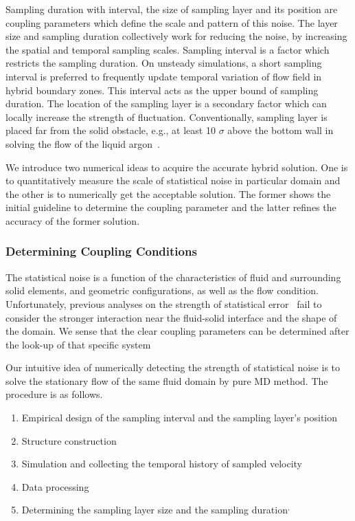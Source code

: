 \documentclass[preprint,12pt]{elsarticle}
\begin{document}
Sampling duration with interval, the size of sampling layer and its position are coupling parameters which define the scale and pattern of this noise. The layer size and sampling duration collectively work for reducing the noise, by increasing the spatial and temporal sampling scales. Sampling interval is a factor which restricts the sampling duration. On unsteady simulations, a short sampling interval is preferred to frequently update temporal variation of flow field in hybrid boundary zones. This interval acts as the upper bound of sampling duration. The location of the sampling layer is a secondary factor which can locally increase the strength of fluctuation. Conventionally, sampling layer is placed far from the solid obstacle, e.g., at least 10 $\sigma$ above the bottom wall in solving the flow of the liquid argon~\cite{Yen}.

We introduce two numerical ideas to acquire the accurate hybrid solution. One is to quantitatively measure the scale of statistical noise in particular domain and the other is to numerically get the acceptable solution. The former shows the initial guideline to determine the coupling parameter and the latter refines the accuracy of the former solution.


\subsubsection{Determining Coupling Conditions}
\label{sec:numerical_parameters}
The statistical noise is a function of the characteristics of fluid and surrounding solid elements, and geometric configurations, as well as the flow condition.
Unfortunately, previous analyses on the strength of statistical error~\cite{Hadjicon3,Time_Mechanism} fail to consider the stronger interaction near the fluid-solid interface and the shape of the domain. We sense that the clear coupling parameters can be determined after the look-up of that specific system


Our intuitive idea of numerically detecting the strength of statistical noise is to solve the stationary flow of the same fluid domain by pure MD method. The procedure is as follows.
\begin{enumerate}
\item Empirical design of the sampling interval and the sampling layer's position\footnotemark
\item Structure construction\footnotemark
\item Simulation and collecting the temporal history of sampled velocity\footnotemark
\item Data processing\footnotemark
\item Determining the sampling layer size and the sampling duration\footnotemark$^{,}$\footnotemark
\end{enumerate}
\end{document}
